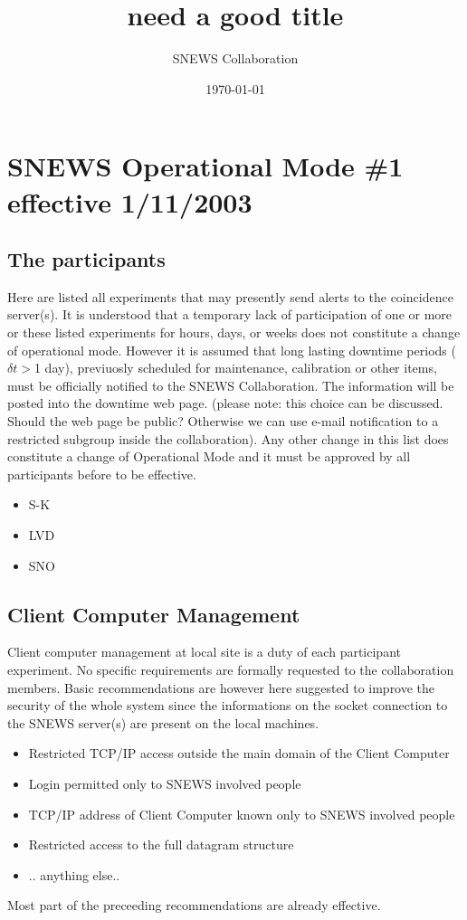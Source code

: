\documentclass{article}
\begin{document}
\title{need a good title}         
\author{SNEWS Collaboration}
\date{\today}
\maketitle

\section{SNEWS Operational Mode \#1 effective 1/11/2003}

\subsection{The participants}
Here are listed all experiments that may presently send
alerts to the coincidence server(s).  It is understood that a
temporary lack of participation of one or more or these listed
experiments for hours, days, or weeks does not constitute a
change of operational mode.  
However it is assumed that long lasting downtime periods ($\delta t>$1 day),
previuosly scheduled for maintenance, calibration or other items, 
must be officially notified to the SNEWS Collaboration. 
The information will be posted into the downtime web page.
(please note: this choice can be discussed. Should the web page be public? 
Otherwise we can use e-mail notification to a restricted  subgroup inside the 
collaboration).
Any other change in this list does constitute a change of Operational Mode
and it must be approved by all participants before to be effective.


\begin{itemize}
\item S-K
\item LVD
\item SNO
\end{itemize}

\subsection{Client Computer Management}

Client computer management at local site is a duty of each participant 
experiment. 
No specific requirements are formally requested to the collaboration members. 
Basic recommendations are however here suggested to improve the security of 
the whole system since the informations on the socket connection to the SNEWS 
server(s) are present on the local machines. 
\begin{itemize}
\item Restricted TCP/IP access outside the main domain of the Client Computer
\item Login permitted only to SNEWS involved people
\item TCP/IP address of Client Computer known only to SNEWS involved people  
\item Restricted access to the full datagram structure 
\item .. anything else..
\end{itemize}
Most part of the preceeding recommendations are already effective.
\end{document}
